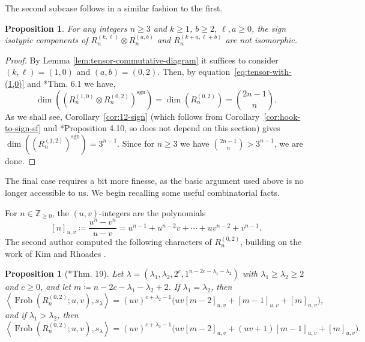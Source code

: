 \documentclass[11pt, reqno]{amsart}
\newtheorem{proposition}[theorem]{Proposition}
\theoremstyle{definition}
\theoremstyle{remark}
\numberwithin{equation}{section}
\newcommand{\0}{\emptyset}
\newcommand{\Z}{\mathbb{Z}}
\DeclareMathOperator{\Frob}{Frob}
\DeclareMathOperator{\sgn}{sgn}
\begin{document}
The second subcase follows in a similar fashion to the first.

\begin{proposition}
    \label{prop:(1,0)x(0,2)}
    For any integers $n\geq 3$ and $k\geq 1$, $b\geq 2$, $\ell,a\geq0$, the sign isotypic components of $R_n^{(k,\ell)} \otimes R_n^{(a,b)}$ and $R_n^{(k+a, \ell+b)}$ are not isomorphic. 
\end{proposition}

\begin{proof}
    By Lemma \ref{lem:tensor-commutative-diagram} it suffices to consider $(k,\ell)=(1,0)$ and $(a,b)=(0,2)$. 
    Then, by equation~\eqref{eq:tensor-with-(1,0)} and \cite{KimRhoades2022}*{Thm. 6.1} we have, 
    \[
        \dim\left( \left(R_n^{(1,0)} \otimes R_n^{(0,2)}\right)^{\sgn}\right) = \dim\left(R_n^{(0,2)}\right) = \binom{2n-1}{n}.
    \]
    As we shall see, Corollary~\ref{cor:12-sign} (which follows from Corollary~\ref{cor:hook-to-sign-sf} and \cite{BCJLR}*{Proposition 4.10}, so does not depend on this section) gives $\dim\left(\left(R_n^{(1,2)}\right)^{\sgn}\right) = 3^{n-1}$. Since for $n\geq 3$ we have $\binom{2n-1}{n}> 3^{n-1}$, we are done.
\end{proof}

The final case requires a bit more finesse, 
as the basic argument used above is no longer accessible to us. 
We begin recalling some useful combinatorial facts. 

For $n \in \Z_{\geq 0}$, the $(u,v)$-integers are the polynomials
\[[n]_{u,v} \coloneqq 
\frac{u^n-v^n}{u-v} = 
u^{n-1} + u^{n-2}v + \cdots + uv^{n-2} + v^{n-1} .\]
The second author computed the following characters of $R_n^{(0,2)}$, building on the work of Kim and Rhoades \cite{KimRhoades2022}. 
\begin{proposition}[{\cite{Lentfer2025}*{Thm. 19}}]
    \label{prop:02-all-characters}
    Let $\lambda = (\lambda_1, \lambda_2, 2^{c}, 1^{n-2c-\lambda_1-\lambda_2})$ with $\lambda_1 \geq \lambda_2 \geq 2$ and $c \geq 0$, and let $m \coloneqq n - 2c - \lambda_1 - \lambda_2 + 2$. If $\lambda_1 = \lambda_2$, then
    \begin{equation}\label{eq:(0,2)-fathook-character}
        \left\langle \Frob(R_n^{(0,2)};u,v), s_{\lambda} \right\rangle = (uv)^{c+\lambda_2-1}\big(uv[m-2]_{u,v} + [m-1]_{u,v} + [m]_{u,v}\big),
    \end{equation}
    and if $\lambda_1 > \lambda_2$, then
    \begin{equation}\label{eq:(0,2)-doublehook-character}
        \left\langle \Frob(R_n^{(0,2)};u,v), s_{\lambda} \right\rangle = (uv)^{c+\lambda_2-1}\big(uv[m-2]_{u,v} + (uv+1)[m-1]_{u,v} + [m]_{u,v}\big).
    \end{equation}
\end{proposition}
\end{document}
